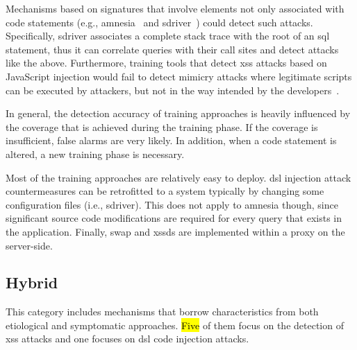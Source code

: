 \documentclass[10pt,journal,compsoc]{IEEEtran}
\newcommand{\hlc}[2][yellow]{ {\sethlcolor{#1} \hl{#2}} }
\begin{document}
Mechanisms based on signatures that involve elements not only
associated with code statements (e.g.,
{\sc amnesia}~\cite{HO05b} and
{\sc sd}river~\cite{MS09})
could detect such attacks. Specifically, {\sc sd}river
associates a complete stack trace with the root of an {\sc sql}
statement, thus it can correlate queries with their call sites and
detect attacks like the above. Furthermore, training
tools that detect {\sc xss} attacks based on JavaScript injection
would fail to detect mimicry attacks where legitimate scripts can be
executed by attackers, but not in the way intended by the
developers~\cite{APKLM10}.

In general, the detection accuracy of training approaches is heavily
influenced by the coverage that is achieved during the training phase. If
the coverage is insufficient,
false alarms are very likely. In
addition, when a code statement is altered, a new training phase is
necessary.

Most of the training approaches are relatively easy to deploy.
{\sc dsl} injection attack countermeasures
can be retrofitted to a system typically by changing
some configuration files (i.e., {\sc sd}river).
This does not apply to {\sc amnesia}
though, since significant source code
modifications are required for every query that exists
in the application. Finally, {\sc swap} and {\sc xssds}
are implemented within a proxy on the server-side.

\vspace{-0.3mm}
\subsection{Hybrid}
\label{sec:hybrid}
\vspace{-0.8mm}

This category includes mechanisms that borrow
characteristics from both etiological and symptomatic approaches.
\hlc[yellow]{Five} of them focus on the detection of {\sc xss}
attacks and one focuses on {\sc dsl} code injection attacks.
\end{document}
